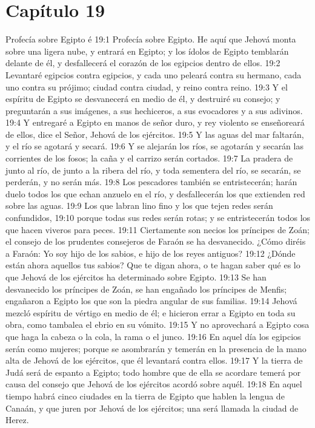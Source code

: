 \section*{Capítulo 19 }
Profecía sobre Egipto 
é
19:1 Profecía sobre Egipto. He aquí que Jehová monta sobre una ligera nube, y entrará en Egipto; y los ídolos de Egipto temblarán delante de él, y desfallecerá el corazón de los egipcios dentro de ellos. 
19:2 Levantaré egipcios contra egipcios, y cada uno peleará contra su hermano, cada uno contra su prójimo; ciudad contra ciudad, y reino contra reino. 
19:3 Y el espíritu de Egipto se desvanecerá en medio de él, y destruiré su consejo; y preguntarán a sus imágenes, a sus hechiceros, a sus evocadores y a sus adivinos. 
19:4 Y entregaré a Egipto en manos de señor duro, y rey violento se enseñoreará de ellos, dice el Señor, Jehová de los ejércitos. 
19:5 Y las aguas del mar faltarán, y el río se agotará y secará. 
19:6 Y se alejarán los ríos, se agotarán y secarán las corrientes de los fosos; la caña y el carrizo serán cortados. 
19:7 La pradera de junto al río, de junto a la ribera del río, y toda sementera del río, se secarán, se perderán, y no serán más. 
19:8 Los pescadores también se entristecerán; harán duelo todos los que echan anzuelo en el río, y desfallecerán los que extienden red sobre las aguas. 
19:9 Los que labran lino fino y los que tejen redes serán confundidos, 
19:10 porque todas sus redes serán rotas; y se entristecerán todos los que hacen viveros para peces. 
19:11 Ciertamente son necios los príncipes de Zoán; el consejo de los prudentes consejeros de Faraón se ha desvanecido. ¿Cómo diréis a Faraón: Yo soy hijo de los sabios, e hijo de los reyes antiguos? 
19:12 ¿Dónde están ahora aquellos tus sabios? Que te digan ahora, o te hagan saber qué es lo que Jehová de los ejércitos ha determinado sobre Egipto. 
19:13 Se han desvanecido los príncipes de Zoán, se han engañado los príncipes de Menfis; engañaron a Egipto los que son la piedra angular de sus familias. 
19:14 Jehová mezcló espíritu de vértigo en medio de él; e hicieron errar a Egipto en toda su obra, como tambalea el ebrio en su vómito. 
19:15 Y no aprovechará a Egipto cosa que haga la cabeza o la cola, la rama o el junco. 
19:16 En aquel día los egipcios serán como mujeres; porque se asombrarán y temerán en la presencia de la mano alta de Jehová de los ejércitos, que él levantará contra ellos. 
19:17 Y la tierra de Judá será de espanto a Egipto; todo hombre que de ella se acordare temerá por causa del consejo que Jehová de los ejércitos acordó sobre aquél. 
19:18 En aquel tiempo habrá cinco ciudades en la tierra de Egipto que hablen la lengua de Canaán, y que juren por Jehová de los ejércitos; una será llamada la ciudad de Herez. 
